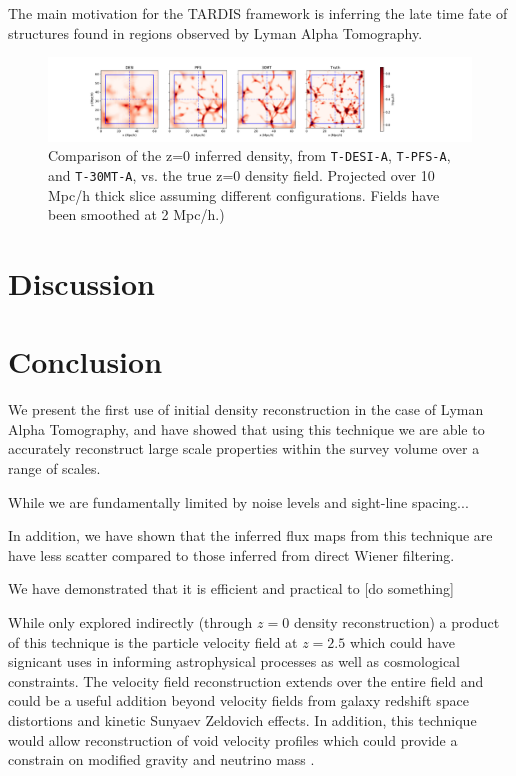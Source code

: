 \documentclass[usenatbib,onecolumn]{mnras}
\begin{document}
The main motivation for the TARDIS framework is inferring the late time fate of structures found in regions observed by Lyman Alpha Tomography. 

\begin{figure}
  \centering  \includegraphics[trim=3cm 0cm 0cm 0cm,width=1.2\textwidth]{./figs_treepm/z=0_density.pdf}
    \caption{Comparison of the z=0 inferred density, from \texttt{T-DESI-A}, \texttt{T-PFS-A}, and \texttt{T-30MT-A}, vs. the true z=0 density field. Projected over 10 Mpc/h thick slice assuming different configurations. Fields have been smoothed at 2 Mpc/h.)} 
    \label{fig_config}
\end{figure}




\section{Discussion}

\section{Conclusion}


We present the first use of initial density reconstruction in the case of Lyman Alpha Tomography, and have showed that using this technique we are able to accurately reconstruct large scale properties within the survey volume over a range of scales.

While we are fundamentally limited by noise levels and sight-line spacing...

In addition, we have shown that the inferred flux maps from this technique are have less scatter compared to those inferred from direct Wiener filtering.

We have demonstrated that it is efficient and practical to [do something]

While only explored indirectly (through $z=0$ density reconstruction) a product of this technique is the particle velocity field at $z=2.5$ which could have signicant uses in informing astrophysical processes as well as cosmological constraints. The velocity field reconstruction extends over the entire field and could be a useful addition beyond velocity fields from galaxy redshift space distortions and kinetic Sunyaev Zeldovich effects.\cite{2017Sugiyama} In addition, this technique would allow reconstruction of void velocity profiles which could provide a constrain on modified gravity \cite{2018Falck} and neutrino mass \cite{2015Massara}.
\end{document}
